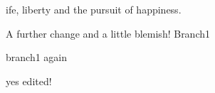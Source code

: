 \documentclass{article}
\begin{document}
ife, liberty and the pursuit of happiness.

A further change and a little blemish! Branch1

branch1 again

yes edited!
\end{document}
